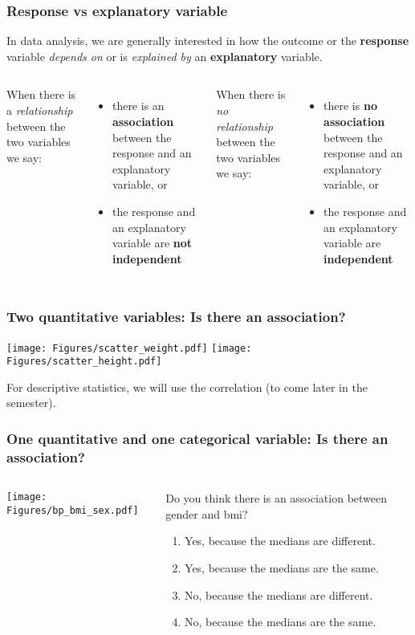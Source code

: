 \begin{frame}
\frametitle{Response vs explanatory variable}
In data analysis, we are generally interested in how the outcome or the \textbf{response} variable \emph{depends on} or is \emph{explained by} an \textbf{explanatory} variable.  
\vskip10pt
\begin{columns}
When there is a \emph{relationship} between the two variables we say:
\begin{itemize}
\item 
there is an \textbf{association} between the response and an explanatory variable, or
\item 
the response and an explanatory variable are \textbf{not independent}
\end{itemize}
When there is \emph{no relationship} between the two variables we say:
\begin{itemize}
\item
there is \textbf{no association} between the response and an explanatory variable, or
\item
the response and an explanatory variable are \textbf{independent}
\end{itemize}
\end{columns}
\end{frame}

\begin{frame}
\frametitle{Two quantitative variables: Is there an association?}
\begin{center}
\texttt{[image: Figures/scatter\_weight.pdf]}
\texttt{[image: Figures/scatter\_height.pdf]}
\end{center}
For descriptive statistics, we will use the correlation (to come later in the semester).
\end{frame}

\begin{frame}
\frametitle{One quantitative and one categorical variable: Is there an association?}
\begin{columns}
\texttt{[image: Figures/bp\_bmi\_sex.pdf]}
\grp
\begin{clicker}{Do you think there is an association between gender and bmi?}
\begin{enumerate}
    \item
    Yes, because the medians are different.
    \item
    Yes, because the medians are the same.
    \item
    No, because the medians are different.
    \item
    No, because the medians are the same.
\end{enumerate}
\end{clicker}
\end{columns}
\end{frame}

